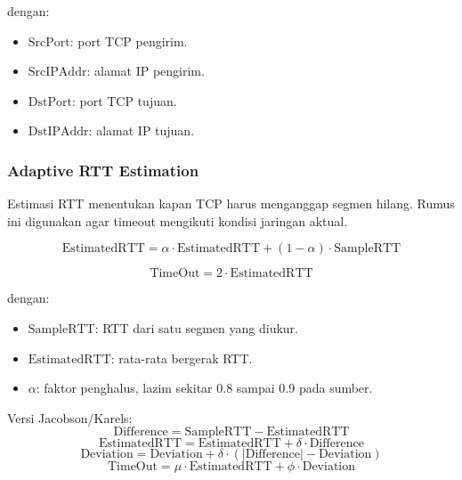 dengan:
\begin{itemize}
    \item $\text{SrcPort}$: port TCP pengirim.
    \item $\text{SrcIPAddr}$: alamat IP pengirim.
    \item $\text{DstPort}$: port TCP tujuan.
    \item $\text{DstIPAddr}$: alamat IP tujuan.
\end{itemize}

\subsubsection{Adaptive RTT Estimation}
\begin{jawab}
Estimasi RTT menentukan kapan TCP harus menganggap segmen hilang. Rumus ini digunakan agar timeout mengikuti kondisi jaringan aktual.
\end{jawab}

\begin{equation}
    \text{EstimatedRTT} =
    \alpha \cdot \text{EstimatedRTT} + (1-\alpha)\cdot \text{SampleRTT}
    \label{eq:estimated-rtt}
\end{equation}

\begin{equation}
    \text{TimeOut} = 2 \cdot \text{EstimatedRTT}
    \label{eq:timeout-simple}
\end{equation}

dengan:
\begin{itemize}
    \item $\text{SampleRTT}$: RTT dari satu segmen yang diukur.
    \item $\text{EstimatedRTT}$: rata-rata bergerak RTT.
    \item $\alpha$: faktor penghalus, lazim sekitar $0.8$ sampai $0.9$ pada sumber.
\end{itemize}

Versi Jacobson/Karels:
\begin{equation}
    \text{Difference} = \text{SampleRTT} - \text{EstimatedRTT}
    \label{eq:rtt-difference}
\end{equation}
\begin{equation}
    \text{EstimatedRTT} = \text{EstimatedRTT} + \delta \cdot \text{Difference}
    \label{eq:jk-estimated-rtt}
\end{equation}
\begin{equation}
    \text{Deviation} = \text{Deviation} + \delta \cdot (|\text{Difference}|-\text{Deviation})
    \label{eq:jk-deviation}
\end{equation}
\begin{equation}
    \text{TimeOut} = \mu \cdot \text{EstimatedRTT} + \phi \cdot \text{Deviation}
    \label{eq:jk-timeout}
\end{equation}

